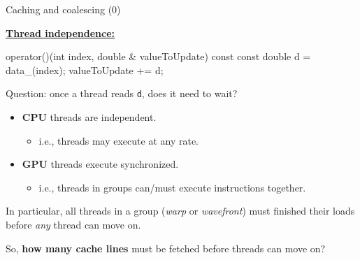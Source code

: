 
\begin{frame}[fragile]{Caching and coalescing (0)}

  \ul{\textbf{Thread independence:}}

  \begin{code}[keywords={}]
operator()(int index, double & valueToUpdate) const {
  const double d = data_(index);
  valueToUpdate += d;
}
  \end{code}

  Question: once a thread reads \texttt{d}, does it need to wait?

  \pause

  \begin{itemize}
    \item \textbf{CPU} threads are independent.
       \begin{itemize}
	   \item i.e., threads may execute at any rate.
       \end{itemize}
  \item<3->{\textbf{GPU} threads execute synchronized. 
	  \begin{itemize}
	     \item i.e., threads in groups can/must execute instructions together.
	  \end{itemize}}
  \end{itemize}

  \pause
  \pause

	In particular, all threads in a group (\emph{warp} or \emph{wavefront}) must finished their loads before \emph{any} thread can move on.

  \vspace{5pt}

  \pause

  So, \textbf{how many cache lines} must be fetched before threads can move on?

\end{frame}


